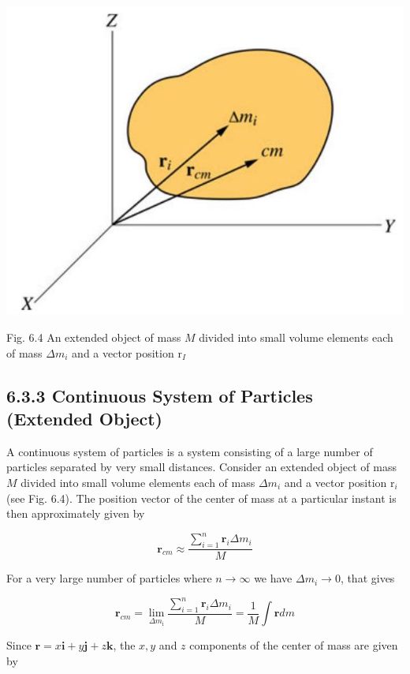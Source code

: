 \documentclass[10pt]{article}
\begin{document}
\begin{center}
\includegraphics[max width=\textwidth]{2024_09_13_db1f357d2aad0a03eb2eg-097}
\end{center}

Fig. 6.4 An extended object of mass $M$ divided into small volume elements each of mass $\Delta m_{i}$ and a vector position $\mathrm{r}_{I}$

\subsection*{6.3.3 Continuous System of Particles (Extended Object)}
A continuous system of particles is a system consisting of a large number of particles separated by very small distances. Consider an extended object of mass $M$ divided into small volume elements each of mass $\Delta m_{i}$ and a vector position $\mathrm{r}_{i}$ (see Fig. 6.4). The position vector of the center of mass at a particular instant is then approximately given by

$$
\mathbf{r}_{c m} \approx \frac{\sum_{i=1}^{n} \mathbf{r}_{i} \Delta m_{i}}{M}
$$

For a very large number of particles where $n \rightarrow \infty$ we have $\Delta m_{i} \rightarrow 0$, that gives

$$
\mathbf{r}_{c m}=\lim _{\Delta m_{\mathrm{i}}} \frac{\sum_{i=1}^{n} \mathbf{r}_{i} \Delta m_{i}}{M}=\frac{1}{M} \int \mathbf{r} d m
$$

Since $\mathbf{r}=x \mathbf{i}+y \mathbf{j}+z \mathbf{k}$, the $x, y$ and $z$ components of the center of mass are given by
\end{document}
